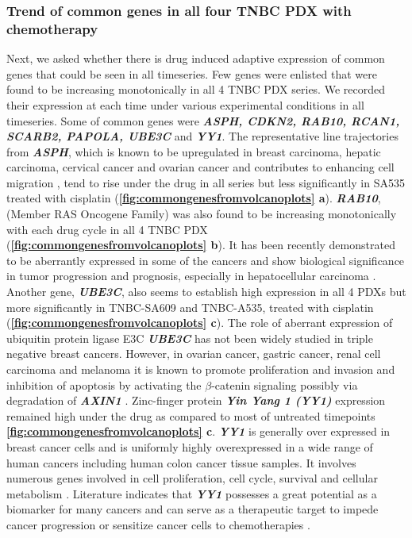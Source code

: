 \subsubsection{Trend of common genes in all four TNBC PDX with  chemotherapy}
Next, we asked whether there is drug induced adaptive expression of common genes that could be seen in all timeseries. 
 Few genes were enlisted that were found to be increasing monotonically in all 4 TNBC PDX series. We recorded their expression at each time under various experimental conditions in all timeseries. Some of common genes were  \textit{\textbf{ASPH, CDKN2, RAB10, RCAN1, SCARB2, PAPOLA, UBE3C}} and \textit{\textbf{YY1}}. The representative line trajectories from \textit{\textbf{ASPH}}, which is known to be upregulated in breast carcinoma, hepatic carcinoma, cervical cancer and ovarian cancer and contributes to enhancing cell migration  \cite{zheng2020diverse,li2018expression, hou2018recent, lin2019asph}, tend to rise under the drug in all series but less significantly in SA535 treated with cisplatin (\textbf{\autoref{fig:commongenesfromvolcanoplots} a}). 
 \textit{\textbf{RAB10}}, (Member RAS Oncogene Family) was also found to be increasing monotonically with each drug cycle in all 4 TNBC PDX (\textbf{\autoref{fig:commongenesfromvolcanoplots} b}). It has been recently demonstrated to be aberrantly expressed in some of the cancers and show biological significance in tumor progression and prognosis, especially in hepatocellular carcinoma \cite{wang2017rab10, he2002identification, jiang2016mir}. 
Another gene,  \textit{\textbf{UBE3C}}, also seems to establish high expression in all 4 PDXs but more significantly in TNBC-SA609 and TNBC-A535, treated with cisplatin (\textbf{\autoref{fig:commongenesfromvolcanoplots} c}). The role of aberrant expression of ubiquitin protein ligase E3C \textit{\textbf{UBE3C}} has not been widely studied in triple negative breast cancers. However, in ovarian cancer, gastric cancer, renal cell carcinoma and melanoma it is known to promote proliferation and invasion and inhibition of apoptosis by activating the $\beta$-catenin signaling possibly via degradation of  \textbf{\textit{AXIN1}} \cite{xiong2019mir, pan2015ubiquitin, zhang2020ube3c}.
  Zinc-finger protein  \textit{\textbf{Yin Yang 1 (YY1)}}  expression remained high under the drug as compared to most of untreated timepoints \textbf{\autoref{fig:commongenesfromvolcanoplots} c}. \textit{\textbf{YY1}} is generally over expressed in breast cancer cells 
and is uniformly highly overexpressed in a wide range of human cancers including human colon cancer tissue samples. It involves numerous genes involved in cell proliferation, cell cycle, survival and cellular metabolism \cite{wan2012yin, chinnappan2009transcription, meliala2020biological}. Literature indicates that \textit{\textbf{YY1}} possesses a great potential as a biomarker for many cancers and can serve as a therapeutic target to impede cancer progression or sensitize cancer cells to chemotherapies \cite{wan2012yin, chinnappan2009transcription, meliala2020biological, shi2015role}.


